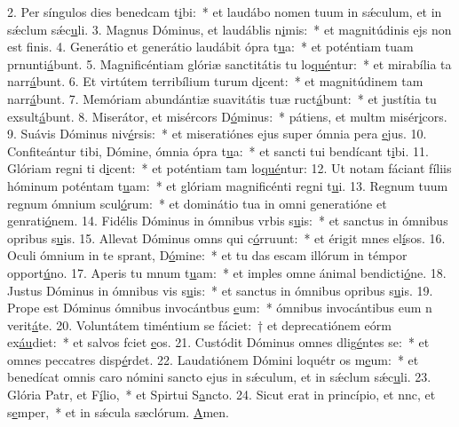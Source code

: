 2. Per síngulos dies benedcam t\uline{i}bi:~* et laudábo nomen tuum in sǽculum, et in sǽclum sǽc\uline{u}li.
3. Magnus Dóminus, et laudáblis n\uline{i}mis:~* et magnitúdinis ejs non est f\uline{i}nis.
4. Generátio et generátio laudábit ópra t\uline{u}a:~* et poténtiam tuam prnunti\uline{á}bunt.
5. Magnificéntiam glóriæ sanctitátis tu lo\uline{qué}ntur:~* et mirabília ta narr\uline{á}bunt.
6. Et virtútem terribílium turum d\uline{i}cent:~* et magnitúdinem tam narr\uline{á}bunt.
7. Memóriam abundántiæ suavitátis tuæ ruct\uline{á}bunt:~* et justítia tu exsult\uline{á}bunt.
8. Miserátor, et misércors D\uline{ó}minus:~* pátiens, et multm misér\uline{i}cors.
9. Suávis Dóminus niv\uline{é}rsis:~* et miseratiónes ejus super ómnia pera \uline{e}jus.
10. Confiteántur tibi, Dómine, ómnia ópra t\uline{u}a:~* et sancti tui bendícant t\uline{i}bi.
11. Glóriam regni ti d\uline{i}cent:~* et poténtiam tam lo\uline{qué}ntur:
12. Ut notam fáciant fíliis hóminum poténtam t\uline{u}am:~* et glóriam magnificénti regni t\uline{u}i.
13. Regnum tuum regnum ómnium scul\uline{ó}rum:~* et dominátio tua in omni generatióne et genrati\uline{ó}nem.
14. Fidélis Dóminus in ómnibus vrbis s\uline{u}is:~* et sanctus in ómnibus opribus s\uline{u}is.
15. Allevat Dóminus omns qui c\uline{ó}rruunt:~* et érigit mnes el\uline{í}sos.
16. Oculi ómnium in te sprant, D\uline{ó}mine:~* et tu das escam illórum in témpor opport\uline{ú}no.
17. Aperis tu mnum t\uline{u}am:~* et imples omne ánimal bendicti\uline{ó}ne.
18. Justus Dóminus in ómnibus vis s\uline{u}is:~* et sanctus in ómnibus opribus s\uline{u}is.
19. Prope est Dóminus ómnibus invocántbus \uline{e}um:~* ómnibus invocántibus eum n verit\uline{á}te.
20. Voluntátem timéntium se fáciet:~† et deprecatiónem eórm ex\uline{áu}diet:~* et salvos fciet \uline{e}os.
21. Custódit Dóminus omnes dlig\uline{é}ntes se:~* et omnes peccatres disp\uline{é}rdet.
22. Laudatiónem Dómini loquétr os m\uline{e}um:~* et benedícat omnis caro nómini sancto ejus in sǽculum, et in sǽclum sǽc\uline{u}li.
23. Glória Patr, et F\uline{í}lio,~* et Spirtui S\uline{a}ncto.
24. Sicut erat in princípio, et nnc, et s\uline{e}mper,~* et in sǽcula sæclórum. \uline{A}men.
